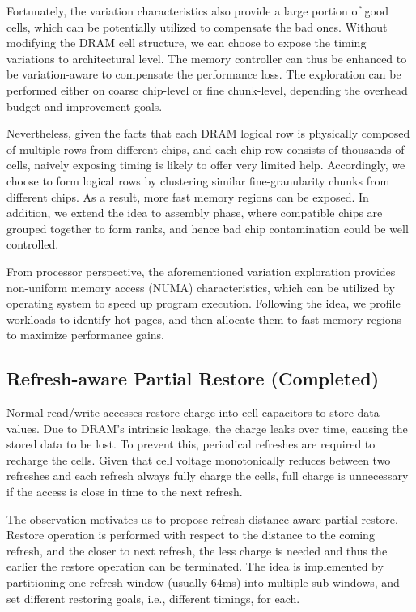 Fortunately, the variation characteristics also provide a large portion of good cells, which can be potentially utilized to compensate the bad ones.
Without modifying the DRAM cell structure, we can choose to expose the timing variations to architectural level. The memory controller can thus be enhanced to be variation-aware to compensate the performance loss.
The exploration can be performed either on coarse chip-level or fine chunk-level, depending the overhead budget and improvement goals.

Nevertheless, given the facts that each DRAM logical row is physically composed of multiple rows from different chips, and each chip row consists of thousands of cells, naively exposing timing is likely to offer very limited help. Accordingly, we choose to form logical rows by clustering similar fine-granularity chunks from different chips.
As a result, more fast memory regions can be exposed. 
In addition, we extend the idea to assembly phase, where compatible chips are grouped together to form ranks, and hence bad chip contamination could be well controlled.

From processor perspective, the aforementioned variation exploration provides non-uniform memory access (NUMA) characteristics, which can be utilized by operating system to speed up program execution.
Following the idea, we profile workloads to identify hot pages, and then allocate them to fast memory regions to maximize performance gains.

\subsection{Refresh-aware Partial Restore (Completed)}
Normal read/write accesses restore charge into cell capacitors to store data values. Due to DRAM's intrinsic leakage, the charge leaks over time, causing the stored data to be lost. To prevent this, periodical refreshes are required to recharge the cells. Given that cell voltage monotonically reduces between two refreshes and each refresh always fully charge the cells, full charge is unnecessary if the access is close in time to the next refresh.
 
The observation motivates us to propose refresh-distance-aware partial restore.
Restore operation is performed with respect to the distance to the coming refresh, and the closer to next refresh, the less charge is needed and thus the earlier the restore operation can be terminated. The idea is implemented by partitioning one refresh window (usually 64ms) into multiple sub-windows, and set different restoring goals, i.e., different timings, for each.


